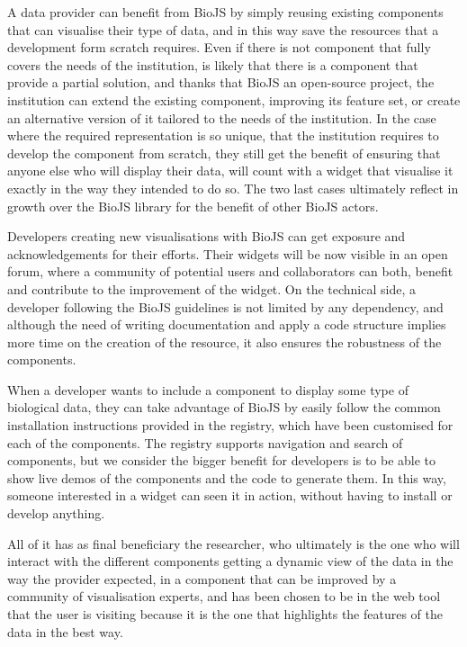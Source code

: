 A data provider can benefit from BioJS by simply reusing existing components that can visualise their type of data, and in this way save the resources that a development form scratch requires. Even if there is not component that fully covers the needs of the institution, is likely that there is a component that provide a partial solution, and thanks that BioJS an open-source project, the institution can extend the existing component, improving its feature set, or create an alternative version of it tailored to the needs of the institution. In the case where the required representation is so unique, that the institution requires to develop the component from scratch, they still get the benefit of ensuring that anyone else who will display their data, will count with a widget that visualise it exactly in the way they intended to do so. The two last cases ultimately reflect in growth over the BioJS library for the benefit of other BioJS actors.

Developers creating new visualisations with BioJS can get exposure and acknowledgements for their efforts. Their widgets will be now visible in an open forum, where a community of potential users and collaborators can both, benefit and contribute to the improvement of the widget. On the technical side, a developer following the BioJS guidelines is not limited by any dependency, and although the need of writing documentation and apply a code structure implies more time on the creation of the resource, it also ensures the robustness of the components.

When a developer wants to include a component to display some type of biological data, they can take advantage of BioJS by easily follow the common installation instructions provided in the registry, which have been customised for each of the components. The registry supports navigation and search of components, but we consider the bigger benefit for developers is to be able to show live demos of the components and the code to generate them. In this way, someone interested in a widget can seen it in action, without having to install or develop anything.

All of it has as final beneficiary the researcher, who ultimately is the one who will interact with the different components getting a dynamic view of the data in the way the provider expected, in a component that can be improved by a community of visualisation experts, and has been chosen to be in the web tool that the user is visiting because it is the one that highlights the features of the data in the best way.

